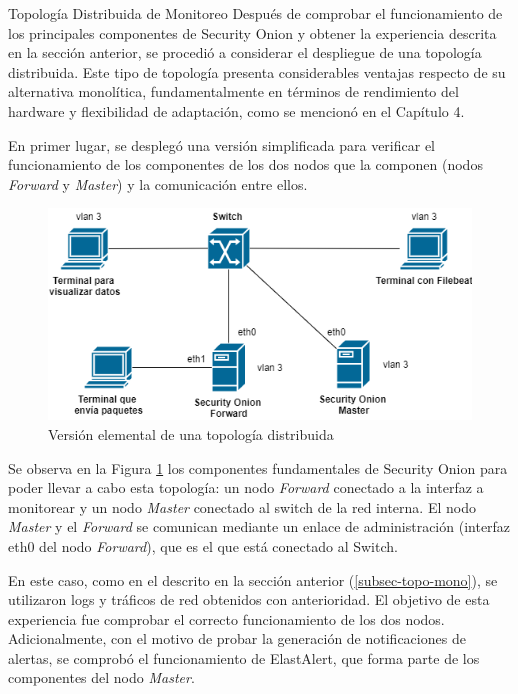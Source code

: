     \begin{subsection}{Topología Distribuida de Monitoreo}
    \label{sec_topo_dist}
    Después de comprobar el funcionamiento de los principales componentes de Security Onion y obtener la experiencia descrita en la sección anterior, se procedió a considerar el despliegue de una topología distribuida. Este tipo de topología presenta considerables ventajas respecto de su alternativa monolítica, fundamentalmente en términos de rendimiento del hardware y flexibilidad de adaptación, como se mencionó en el Capítulo 4.\par
    En primer lugar, se desplegó una versión simplificada para verificar el funcionamiento de los componentes de los dos nodos que la componen (nodos \textit{Forward} y \textit{Master}) y la comunicación entre ellos.
    \begin{figure}[H]
    \centering
    \includegraphics[width=1\textwidth]{./iteracion_1_imagenes/figura_33_b_topologia_de_prueba_2.png}
    \caption{Versión elemental de una topología distribuida}
    \label{fig:topologia_distribuida_1}
    \end{figure}
    Se observa en la Figura \ref{fig:topologia_distribuida_1} los componentes fundamentales de Security Onion para poder llevar a cabo esta topología: un nodo \textit{Forward} conectado a la interfaz a monitorear y un nodo \textit{Master} conectado al switch de la red interna. El nodo \textit{Master} y el \textit{Forward} se comunican mediante un enlace de administración (interfaz eth0 del nodo \textit{Forward}), que es el que está conectado al Switch. \par
    En este caso, como en el descrito en la sección anterior (\ref{subsec-topo-mono}), se utilizaron logs y tráficos de red obtenidos con anterioridad. El objetivo de esta experiencia fue comprobar el correcto funcionamiento de los dos nodos. Adicionalmente, con el motivo de probar la generación de notificaciones de alertas, se comprobó el funcionamiento de ElastAlert, que forma parte de los componentes del nodo \textit{Master}. \par

\end{subsection}
